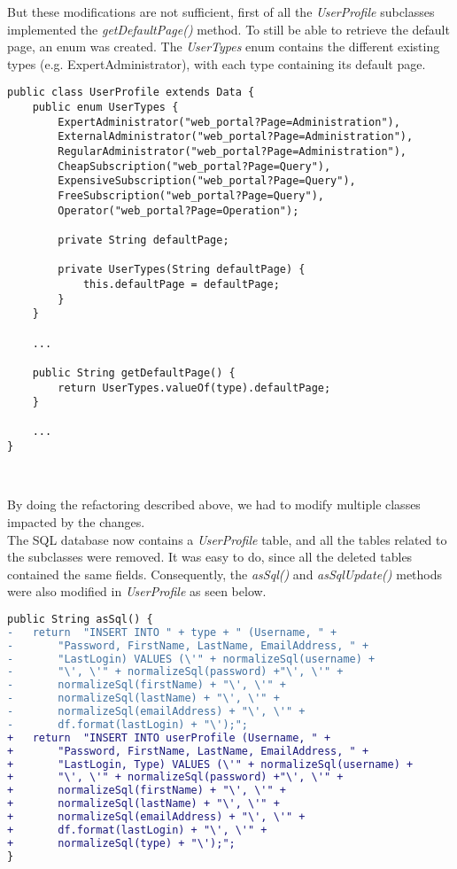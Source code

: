 But these modifications are not sufficient, first of all the
\emph{UserProfile} subclasses implemented the \emph{getDefaultPage()}
method. To still be able to retrieve the default page, an enum was
created. The \emph{UserTypes} enum contains the different existing types
(e.g. ExpertAdministrator), with each type containing its default page.\\

\begin{lstlisting}[caption={UserTypes enum and default page}]
public class UserProfile extends Data {
    public enum UserTypes {
        ExpertAdministrator("web_portal?Page=Administration"),
        ExternalAdministrator("web_portal?Page=Administration"),
        RegularAdministrator("web_portal?Page=Administration"),
        CheapSubscription("web_portal?Page=Query"),
        ExpensiveSubscription("web_portal?Page=Query"),
        FreeSubscription("web_portal?Page=Query"),
        Operator("web_portal?Page=Operation");
        
        private String defaultPage;
 
        private UserTypes(String defaultPage) {
            this.defaultPage = defaultPage;
        }
    }
    
    ...
    
    public String getDefaultPage() {
        return UserTypes.valueOf(type).defaultPage;
    }
    
    ...
}
\end{lstlisting}
\

By doing the refactoring described above, we had to modify multiple classes
impacted by the changes.\\

The SQL database now contains a \emph{UserProfile} table, and all the tables
related to the subclasses were removed. It was easy to do, since all the
deleted tables contained the same fields. Consequently, the \emph{asSql()}
and \emph{asSqlUpdate()} methods were also modified in \emph{UserProfile} as
seen below.\\

\begin{lstlisting}[language=diff, caption={UserProfile asSql() diff}]
public String asSql() {
-   return  "INSERT INTO " + type + " (Username, " +
-       "Password, FirstName, LastName, EmailAddress, " +
-       "LastLogin) VALUES (\'" + normalizeSql(username) +
-       "\', \'" + normalizeSql(password) +"\', \'" +
-       normalizeSql(firstName) + "\', \'" +
-       normalizeSql(lastName) + "\', \'" +
-       normalizeSql(emailAddress) + "\', \'" +
-       df.format(lastLogin) + "\');";
+   return  "INSERT INTO userProfile (Username, " +
+       "Password, FirstName, LastName, EmailAddress, " +
+       "LastLogin, Type) VALUES (\'" + normalizeSql(username) +
+       "\', \'" + normalizeSql(password) +"\', \'" +
+       normalizeSql(firstName) + "\', \'" +
+       normalizeSql(lastName) + "\', \'" +
+       normalizeSql(emailAddress) + "\', \'" +
+       df.format(lastLogin) + "\', \'" +
+       normalizeSql(type) + "\');";
}
\end{lstlisting}
\


